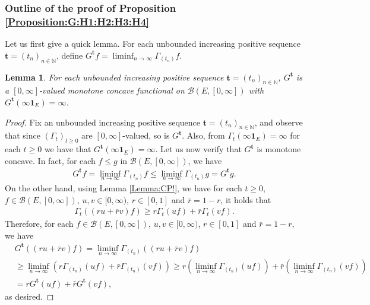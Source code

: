 \documentclass[12pt,a4paper]{amsart}
\numberwithin{equation}{section}
\theoremstyle{plain}
\newtheorem{lem}[thm]{Lemma}
\theoremstyle{definition}
\theoremstyle{remark}
\begin{document}
\subsubsection{Outline of the proof of Proposition \ref{Proposition:G:H1:H2:H3:H4}}
Let us first give a quick lemma.
For each unbounded increasing positive sequence $\mathbf t = (t_n)_{n\in \mathbb N}$, define $G^\mathbf t f = \liminf_{n\to \infty} \Gamma_{(t_n)} f$. 
\begin{lem} \label{Lemma:Gta!} 
For each unbounded increasing positive sequence $\mathbf t = (t_n)_{n\in \mathbb N}$, $G^\mathbf t$ is a $[0,\infty]$-valued monotone concave functional on $\mathcal B(E,[0,\infty])$ with $G^\mathbf t(\infty \mathbf 1_E) = \infty$.
\end{lem}
\begin{proof}
Fix an unbounded increasing positive sequence $\mathbf t = (t_n)_{n\in \mathbb N}$, and observe that since $(\Gamma_t)_{t\geq 0}$ are $[0,\infty]$-valued, so is $G^{\mathbf t}$. 
Also, from $\Gamma_t(\infty \mathbf 1_E) = \infty$ for each $t\geq 0$ we have that $G^{\mathbf t}(\infty \mathbf 1_E) = \infty$. 
Let us now verify that $G^\mathbf t$ is monotone concave. 
In fact, for each $f \leq g$ in $\mathcal B(E,[0,\infty])$, we have
\begin{align} 
 G^{\mathbf t} f 
 = \liminf_{n\to \infty} \Gamma_{(t_n)} f
   \leq \liminf_{n\to \infty} \Gamma_{(t_n)} g
  = G^{\mathbf t} g.
   \end{align}
On the other hand, using Lemma \ref{Lemma:CP!}, we have for each $t\geq 0$, $f\in \mathcal B(E,[0,\infty])$, $u,v \in [0,\infty)$, $r\in [0,1]$ and $\bar r = 1 - r$, it holds that
\begin{align}
 \Gamma_t((ru+\bar r v)f) 
  \geq r \Gamma_t (uf) + \bar r \Gamma_t (vf).
 \end{align}
Therefore, for each $f\in \mathcal B(E,[0,\infty])$, $u,v \in [0,\infty)$, $r \in [0,1]$ and $\bar r = 1 - r$, we have
\begin{align}
 & G^{\mathbf t}((ru + \bar rv)f)
 = \liminf_{n \to \infty} \Gamma_{(t_n)}((ru + \bar rv)f)
 \\&\geq \liminf_{n\to \infty} (r\Gamma_{(t_n)} (uf) + \bar r\Gamma_{(t_n)}(vf)) 
 \geq r (\liminf_{n\to \infty} \Gamma_{(t_n)} (uf)) + \bar r (\liminf_{n\to \infty} \Gamma_{(t_n)}(vf) )
 \\&= r G^{\mathbf t} (uf) + \bar r G^{\mathbf t}(vf),
 \end{align}
as desired.
\end{proof}
\end{document}
